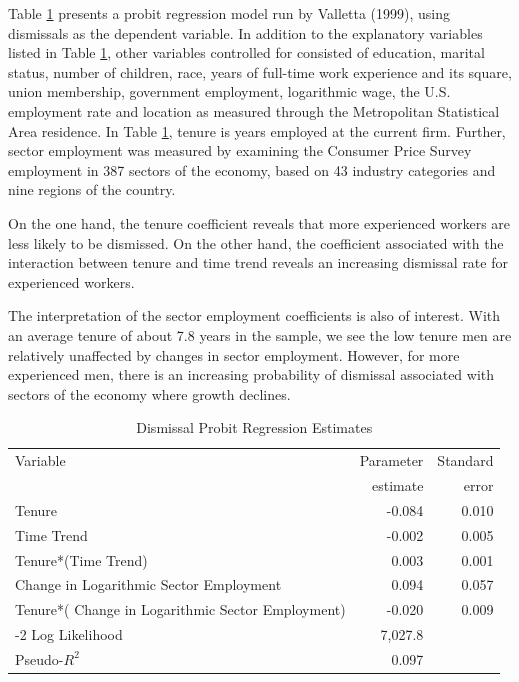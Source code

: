 Table \ref{T11:DismissalProbs} presents a probit regression model
run by Valletta (1999), using dismissals as the dependent variable.
In addition to the explanatory variables listed in Table
\ref{T11:DismissalProbs}, other variables controlled for consisted
of education, marital status, number of children, race, years of
full-time work experience and its square, union membership,
government employment, logarithmic wage, the U.S. employment rate
and location as measured through the Metropolitan Statistical Area
residence. In Table \ref{T11:DismissalProbs}, tenure is years
employed at the current firm. Further, sector employment was
measured by examining the Consumer Price Survey employment in 387
sectors of the economy, based on 43 industry categories and nine
regions of the country.

On the one hand, the tenure coefficient reveals that more
experienced workers are less likely to be dismissed. On the other
hand, the coefficient associated with the interaction between tenure
and time trend reveals an increasing dismissal rate for experienced
workers.

The interpretation of the sector employment coefficients is also of
interest. With an average tenure of about 7.8 years in the sample,
we see the low tenure men are relatively unaffected by changes in
sector employment. However, for more experienced men, there is an
increasing probability of dismissal associated with sectors of the
economy where growth declines.\bigskip

\begin{table}[h]
\caption{\label{T11:DismissalProbs} Dismissal Probit Regression
Estimates}
\begin{center}
\begin{tabular}{lll}
\hline
Variable & Parameter & Standard \\
& \multicolumn{1}{r}{estimate} & \multicolumn{1}{r}{error} \\ \hline
Tenure & \multicolumn{1}{r}{-0.084} & \multicolumn{1}{r}{0.010} \\
Time Trend & \multicolumn{1}{r}{-0.002} & \multicolumn{1}{r}{0.005} \\
Tenure*(Time Trend) & \multicolumn{1}{r}{0.003} &
\multicolumn{1}{r}{0.001}
\\
Change in Logarithmic Sector Employment & \multicolumn{1}{r}{0.094}
&
\multicolumn{1}{r}{0.057} \\
Tenure*( Change in Logarithmic Sector Employment) &
\multicolumn{1}{r}{-0.020 } & \multicolumn{1}{r}{0.009} \\ \hline
-2 Log Likelihood & \multicolumn{1}{r}{7,027.8} &  \\
Pseudo-$R^2$ & \multicolumn{1}{r}{0.097} &  \\ \hline
\end{tabular}\end{center} \linetjed \end{table}



